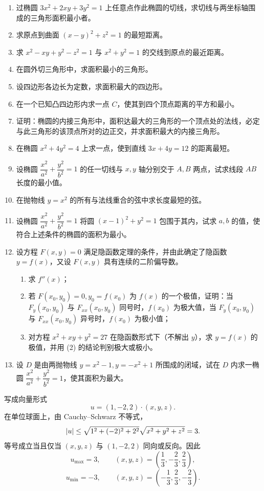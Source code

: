 \begin{xexercise}
\begin{enumerate}[label=\arabic*.,start=16]
  \item 过椭圆 $3x^2+2xy+3y^2=1$ 上任意点作此椭圆的切线，求切线与两坐标轴围成的三角形面积最小者。
  \item 求原点到曲面 $(x-y)^2+z^2=1$ 的最短距离。
  \item 求 $x^2-xy+y^2-z^2=1$ 与 $x^2+y^2=1$ 的交线到原点的最近距离。
  \item 在圆外切三角形中，求面积最小的三角形。
  \item 设四边形各边长为定数，求面积最大的四边形。
  \item 在一个已知凸四边形内求一点 $C$，使其到四个顶点距离的平方和最小。
  \item 证明：椭圆的内接三角形中，面积达最大的三角形的一个顶点处的法线，必定与此三角形的该顶点所对的边正交，并求面积最大的内接三角形。
  \item 在椭圆 $x^2+4y^2=4$ 上求一点，使到直线 $3x+4y=12$ 的距离最短。
  \item 设椭圆 $\dfrac{x^2}{a^2}+\dfrac{y^2}{b^2}=1$ 的任一切线与 $x,y$ 轴分别交于 $A,B$ 两点，试求线段 $AB$ 长度的最小值。
  \item 在抛物线 $y=x^2$ 的所有与法线重合的弦中求长度最短的弦。
  \item 设椭圆 $\dfrac{x^2}{a^2}+\dfrac{y^2}{b^2}=1$ 将圆 $(x-1)^2+y^2=1$ 包围于其内，试求 $a,b$ 的值，使符合上述条件的椭圆的面积为最小。
  \item 设方程 $F(x,y)=0$ 满足隐函数定理的条件，并由此确定了隐函数 $y=f(x)$，又设 $F(x,y)$ 具有连续的二阶偏导数。
  \begin{enumerate}[label=(\arabic*)]
    \item 求 $f''(x)$；
    \item 若 $F(x_0,y_0)=0,y_0=f(x_0)$ 为 $f(x)$ 的一个极值，证明：当 $F_y(x_0,y_0)$ 与 $F_{xx}(x_0,y_0)$ 同号时，$f(x_0)$ 为极大值，当 $F_y(x_0,y_0)$ 与 $F_{xx}(x_0,y_0)$ 异号时，$f(x_0)$ 为极小值；
    \item 对方程 $x^2+xy+y^2=27$ 在隐函数形式下（不解出 $y$），求 $y=f(x)$ 的极值，并用 (2) 的结论判别极大或极小。
  \end{enumerate}
  \item 设 $D$ 是由两抛物线 $y=x^2-1,y=-x^2+1$ 所围成的闭域，试在 $D$ 内求一椭圆 $\dfrac{x^2}{a^2}+\dfrac{y^2}{b^2}=1$，使其面积为最大。
\end{enumerate}
\end{xexercise}
\begin{xsolution}
写成向量形式
\[
  u=(1,-2,2)\cdot(x,y,z).
\]
在单位球面上，由 Cauchy--Schwarz 不等式，
\[
  \lvert u\rvert\le\sqrt{1^2+(-2)^2+2^2}\sqrt{x^2+y^2+z^2}=3.
\]
等号成立当且仅当 $(x,y,z)$ 与 $(1,-2,2)$ 同向或反向。因此
\[
  u_{\max}=3,
  \qquad
  (x,y,z)=\left(\frac13,-\frac23,\frac23\right),
\]
\[
  u_{\min}=-3,
  \qquad
  (x,y,z)=\left(-\frac13,\frac23,-\frac23\right).
\]
\end{xsolution}



